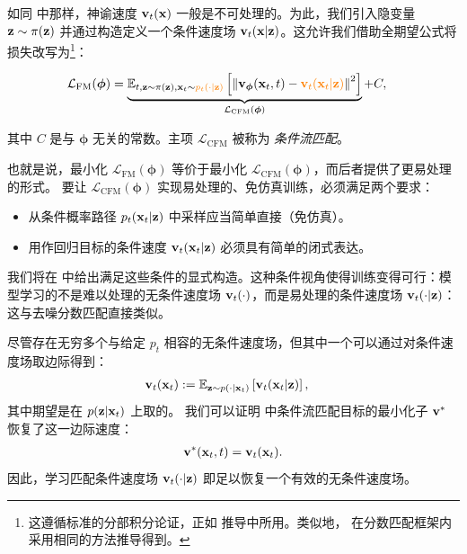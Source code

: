 如同  中那样，神谕速度 ${\mathbf{v}}_t({\mathbf{x}})$ 一般是不可处理的。为此，我们引入隐变量 ${\mathbf{z}} \sim \pi({\mathbf{z}})$ 并通过构造定义一个条件速度场 ${\mathbf{v}}_t({\mathbf{x}} |{\mathbf{z}})$。这允许我们借助全期望公式将损失改写为\footnote{这遵循标准的分部积分论证，正如  推导中所用。类似地， 在分数匹配框架内采用相同的方法推导得到。
}：
\begin{mdframed}
    \begin{align}\label{eq:fm-cfm}
    \mathcal{L}_{\mathrm{FM}}(\bm{\phi}) 
    &= \underbrace{\mathbb{E}_{t, {\mathbf{z}} \sim \pi({\mathbf{z}}), {\mathbf{x}}_t \sim {\color{orange}p_t(\cdot |{\mathbf{z}})}} \left[ \left\| {\mathbf{v}}_{\bm{\phi}}({\mathbf{x}}_t, t) - {\color{orange}{\mathbf{v}}_t({\mathbf{x}}_t |{\mathbf{z}})} \right\|^2 \right]}_{\mathcal{L}_{\mathrm{CFM}}(\bm{\phi})} + C,
\end{align}
\end{mdframed}
其中 $C$ 是与 $\bm{\phi}$ 无关的常数。主项 $\mathcal{L}_{\mathrm{CFM}}$ 被称为 \emph{条件流匹配}。

也就是说，最小化 $\mathcal{L}_{\mathrm{FM}}(\bm{\phi})$ 等价于最小化 $\mathcal{L}_{\mathrm{CFM}}(\bm{\phi})$，而后者提供了更易处理的形式。
要让 $\mathcal{L}_{\mathrm{CFM}}(\bm{\phi})$ 实现易处理的、免仿真训练，必须满足两个要求：
\begin{itemize}
    \item[(i)] 从条件概率路径 $p_t({\mathbf{x}}_t| {\mathbf{z}})$ 中采样应当简单直接（免仿真）。
    \item[(ii)] 用作回归目标的条件速度 ${\mathbf{v}}_t({\mathbf{x}}_t| {\mathbf{z}})$ 必须具有简单的闭式表达。
\end{itemize}
我们将在  中给出满足这些条件的显式构造。这种条件视角使得训练变得可行：模型学习的不是难以处理的无条件速度场 ${\mathbf{v}}_t(\cdot)$，而是易处理的条件速度场 ${\mathbf{v}}_t(\cdot| {\mathbf{z}})$：这与去噪分数匹配直接类似。


尽管存在无穷多个与给定 $p_t$ 相容的无条件速度场，但其中一个可以通过对条件速度场取边际得到：
\begin{align}\label{eq:marginal-oracle-velocity}
{\mathbf{v}}_t({\mathbf{x}}_t) &:= \mathbb{E}_{{\mathbf{z}} \sim p(\cdot|{\mathbf{x}}_t)} \left[ {\mathbf{v}}_t({\mathbf{x}}_t|{\mathbf{z}})\right],
\end{align}
其中期望是在 $p({\mathbf{z}}|{\mathbf{x}}_t)$ 上取的。
我们可以证明  中条件流匹配目标的最小化子 ${\mathbf{v}}^*$ 恢复了这一边际速度：
\begin{align}\label{eq:minimum_velocity}
    {\mathbf{v}}^*({\mathbf{x}}_t, t) = {\mathbf{v}}_t({\mathbf{x}}_t).
\end{align}
因此，学习匹配条件速度场 ${\mathbf{v}}_t(\cdot|{\mathbf{z}})$ 即足以恢复一个有效的无条件速度场。

